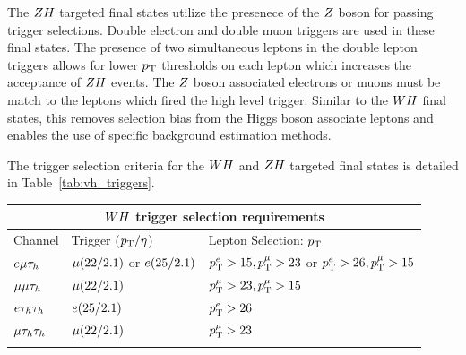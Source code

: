 The $ZH$ targeted final states utilize the presenece of the $Z$ boson
for passing trigger selections. Double electron and double muon triggers are used in these
final states. The presence of two simultaneous leptons in the double lepton
triggers allows for lower $p_\mathrm{T}$ thresholds on each lepton which increases
the acceptance of $ZH$ events. The $Z$ boson associated electrons
or muons must be match to the leptons which fired the high level trigger.
Similar to the $WH$ final states, this removes selection bias from the
Higgs boson associate leptons and enables the use of specific background
estimation methods.

The trigger selection criteria for the $WH$ and $ZH$ targeted final 
states is detailed in Table~\ref{tab:vh_triggers}.


\begin{table}[htbp]
\centering
\begin{small}
\begin{tabular}{lll}
     \multicolumn{3}{c}{$WH$ trigger selection requirements}                 \\ 
\hline
  Channel           &         Trigger ($p_\mathrm{T}/\eta$)         & Lepton Selection: $p_\mathrm{T}$     \\
\hline
 $e\mu\tau_{h}$      &  $\mu (22/2.1)$ or $e (25/2.1)$  &     $p_\mathrm{T}^{e}>15, p_\mathrm{T}^{\mu}>23$ or $p_\mathrm{T}^{e}>26, p_\mathrm{T}^{\mu}>15$  \\ 
 $\mu\mu\tau_{h}$     &  $\mu (22/2.1)$                    &     $p_\mathrm{T}^{\mu}>23,p_\mathrm{T}^{\mu}>15$                               \\ 
 $e\tau_{h}\tau_{h}$     &  $e (25/2.1)$                     &     $p_\mathrm{T}^{e}>26$                                            \\ 
 $\mu\tau_{h}\tau_{h}$    &  $\mu (22/2.1)$                    &     $p_\mathrm{T}^{\mu}>23$                                           \\ 
\hline \\


\end{tabular}
\end{small}
\end{table}
